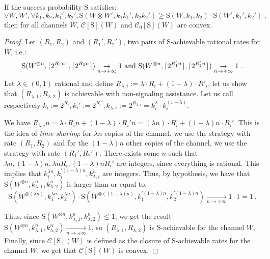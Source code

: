 \begin{proposition}
  \label{prop:timesharing}
  If the success probability $\mathrm{S}$ satisfies:
  \[ \forall W,W', \forall k_1,k_2,k_1',k_2', \mathrm{S}(W \otimes W',k_1k_1',k_2k_2') \geq \mathrm{S}(W,k_1,k_2) \cdot \mathrm{S}(W',k_1',k_2') \ , \]
  then for all channels $W$, $\mathcal{C}[\mathrm{S}](W)$ and $\mathcal{C}_0[\mathrm{S}](W)$ are convex.
\end{proposition}
\begin{proof}
  Let $(R_1,R_2)$ and $(R_1',R_2')$, two pairs of $\mathrm{S}$-achievable rational rates for $W$, i.e.:
    \[ \mathrm{S}(W^{\otimes n},\lceil2^{R_1n}\rceil,\lceil2^{R_2n}\rceil) \underset{n \rightarrow +\infty}{\rightarrow} 1 \text{ and }\mathrm{S}(W^{\otimes n},\lceil2^{R_1'n}\rceil,\lceil2^{R_2'n}\rceil) \underset{n \rightarrow +\infty}{\rightarrow} 1 \ . \]
    Let $\lambda \in (0,1)$ rational and define $R_{\lambda,i} := \lambda \cdot R_i + (1-\lambda) \cdot R'_i$, let us show that $(R_{\lambda,1},R_{\lambda,2})$ is achievable with non-signaling assistance. Let us call respectively $k_i:=2^{R_i}, k_i' := 2^{R_i'}, k_{\lambda,i} := 2^{R_{\lambda,i}} = k_i^{\lambda}\cdot k_i^{(1-\lambda)}$.

    We have $R_{\lambda,i}n = \lambda \cdot R_in + (1-\lambda) \cdot R_i'n = (\lambda n) \cdot R_i + (1-\lambda)n \cdot R_i'$. This is the idea of \emph{time-sharing}: for $\lambda n$ copies of the channel, we use the strategy with rate $(R_1,R_2)$ and for the $(1-\lambda)n$ other copies of the channel, we use the strategy with rate $(R_1',R_2')$. There exists some $n$ such that $\lambda n,(1-\lambda)n,\lambda n R_i,(1-\lambda)n R_i'$ are integers, since everything is rational. This implies that $k_i^{\lambda n},k_i^{\prime (1-\lambda)n},k_{\lambda,i}^n$ are integers. Thus, by hypothesis, we have that $\mathrm{S}(W^{\otimes n},k^n_{\lambda,1},k^n_{\lambda, 2})$ is larger than or equal to:
\[ \mathrm{S}(W^{\otimes (\lambda n)}, k_1^{\lambda n}, k_2^{\lambda n}) \cdot \mathrm{S}(W^{\otimes ((1-\lambda) n)}, k_1^{\prime (1-\lambda) n}, k_2^{\prime (1-\lambda) n}) \underset{n \rightarrow +\infty}{\rightarrow} 1 \cdot 1 = 1  \ .\]

Thus, since $\mathrm{S}(W^{\otimes n},k^n_{\lambda,1},k^n_{\lambda,2}) \leq 1$, we get the result $\mathrm{S}(W^{\otimes n},k^n_{\lambda,1},k^n_{\lambda,2}) \underset{n \rightarrow +\infty}{\rightarrow} 1$, so $(R_{\lambda,1},R_{\lambda,2})$ is $\mathrm{S}$-achievable for the channel $W$. Finally, since $\mathcal{C}[\mathrm{S}](W)$ is defined as the closure of $\mathrm{S}$-achievable rates for the channel $W$, we get that $\mathcal{C}[\mathrm{S}](W)$ is convex.


\end{proof}
